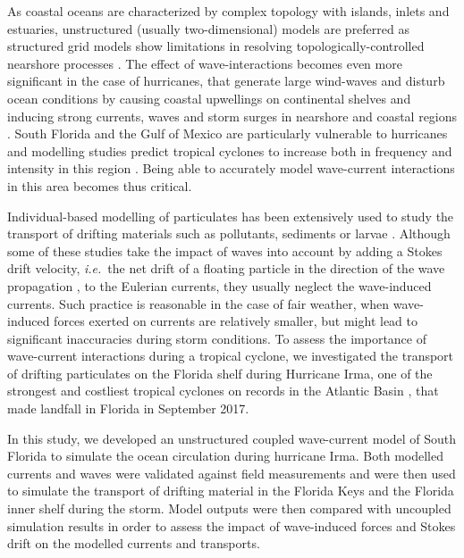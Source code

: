 \documentclass[11pt,a4paper]{article}
\newcommand{\ie}{{\it i.e.}\ }
\begin{document}
As coastal oceans are characterized by complex topology with islands, inlets and estuaries, unstructured (usually two-dimensional) models are preferred as structured grid models show limitations in resolving topologically-controlled nearshore processes \citep{wu2011fvcom, chen2007finite}. The effect of wave-interactions becomes even more significant in the case of hurricanes, that generate large wind-waves and disturb ocean conditions \citep{liu2020impacts} by causing coastal upwellings on continental shelves \citep{smith1982response} and inducing strong currents, waves and storm surges in nearshore and coastal regions \citep{dietrich2010high, weisberg2006hurricane}. South Florida and the Gulf of Mexico are particularly vulnerable to hurricanes \citep{malmstadt2009florida} and modelling studies predict tropical cyclones to increase both in frequency and intensity in this region \citep{marsooli2019climate, knutson2010tropical}. Being able to accurately model wave-current interactions in this area becomes thus critical.

Individual-based modelling of particulates has been extensively used to study the transport of drifting materials such as pollutants, sediments or larvae \citep{garcia2020measuring,liubartseva2018tracking, figueiredo2013synthesizing, frys2020fine}. Although some of these studies take the impact of waves into account by adding a Stokes drift velocity, \ie the net drift of a floating particle in the direction of the wave propagation \citep{van2018stokes}, to the Eulerian currents, they usually neglect the wave-induced currents. Such practice is reasonable in the case of fair weather, when wave-induced forces exerted on currents are relatively smaller, but might lead to significant inaccuracies during storm conditions. To assess the importance of wave-current interactions during a tropical cyclone, we investigated the transport of drifting particulates on the Florida shelf during Hurricane Irma, one of the strongest and costliest tropical cyclones on records in the Atlantic Basin \citep{chen2007finite}, that made landfall in Florida in September 2017.

In this study, we developed an unstructured coupled wave-current model of South Florida to simulate the ocean circulation during hurricane Irma. Both modelled currents and waves were validated against field measurements and were then used to simulate the transport of drifting material in the Florida Keys and the Florida inner shelf during the storm. Model outputs were then compared with uncoupled simulation results in order to assess the impact of wave-induced forces and Stokes drift on the modelled currents and transports.
\end{document}

